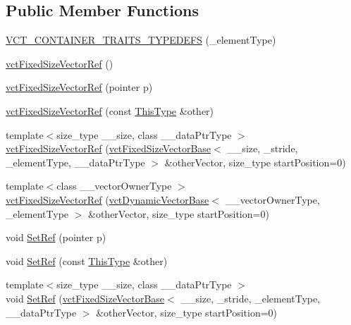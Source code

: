 \subsection*{Public Member Functions}
\begin{DoxyCompactItemize}
\item 
\hyperlink{classvct_fixed_size_vector_ref_a7a66fa8ab6598a28feabe1c86c2f93f9}{V\+C\+T\+\_\+\+C\+O\+N\+T\+A\+I\+N\+E\+R\+\_\+\+T\+R\+A\+I\+T\+S\+\_\+\+T\+Y\+P\+E\+D\+E\+F\+S} (\+\_\+element\+Type)
\item 
\hyperlink{classvct_fixed_size_vector_ref_a543ec7356fcb875f9242700d1928316c}{vct\+Fixed\+Size\+Vector\+Ref} ()
\item 
\hyperlink{classvct_fixed_size_vector_ref_a1fe5202cf31d82049b657f40a3d2caab}{vct\+Fixed\+Size\+Vector\+Ref} (pointer p)
\item 
\hyperlink{classvct_fixed_size_vector_ref_a7434262bdfeea16951f333d9e07113bf}{vct\+Fixed\+Size\+Vector\+Ref} (const \hyperlink{classvct_fixed_size_vector_ref_a3fc8fbdfc7492a38119e7ed7ef5bc289}{This\+Type} \&other)
\item 
{\footnotesize template$<$size\+\_\+type \+\_\+\+\_\+size, class \+\_\+\+\_\+data\+Ptr\+Type $>$ }\\\hyperlink{classvct_fixed_size_vector_ref_abb6cd735a90720681998fd60e78ac6c7}{vct\+Fixed\+Size\+Vector\+Ref} (\hyperlink{classvct_fixed_size_vector_base}{vct\+Fixed\+Size\+Vector\+Base}$<$ \+\_\+\+\_\+size, \+\_\+stride, \+\_\+element\+Type, \+\_\+\+\_\+data\+Ptr\+Type $>$ \&other\+Vector, size\+\_\+type start\+Position=0)
\item 
{\footnotesize template$<$class \+\_\+\+\_\+vector\+Owner\+Type $>$ }\\\hyperlink{classvct_fixed_size_vector_ref_a3d3b0af3edc9d03a70f0df8660117253}{vct\+Fixed\+Size\+Vector\+Ref} (\hyperlink{classvct_dynamic_vector_base}{vct\+Dynamic\+Vector\+Base}$<$ \+\_\+\+\_\+vector\+Owner\+Type, \+\_\+element\+Type $>$ \&other\+Vector, size\+\_\+type start\+Position=0)
\item 
void \hyperlink{classvct_fixed_size_vector_ref_a08bc25aaca173af6a6fbdecd140edbe0}{Set\+Ref} (pointer p)
\item 
void \hyperlink{classvct_fixed_size_vector_ref_a7e79c21f80dbd4137ddfb33ab9c55ecd}{Set\+Ref} (const \hyperlink{classvct_fixed_size_vector_ref_a3fc8fbdfc7492a38119e7ed7ef5bc289}{This\+Type} \&other)
\item 
{\footnotesize template$<$size\+\_\+type \+\_\+\+\_\+size, class \+\_\+\+\_\+data\+Ptr\+Type $>$ }\\void \hyperlink{classvct_fixed_size_vector_ref_a9db29d2d3e4138d144d973224dcb2c39}{Set\+Ref} (\hyperlink{classvct_fixed_size_vector_base}{vct\+Fixed\+Size\+Vector\+Base}$<$ \+\_\+\+\_\+size, \+\_\+stride, \+\_\+element\+Type, \+\_\+\+\_\+data\+Ptr\+Type $>$ \&other\+Vector, size\+\_\+type start\+Position=0)

\end{DoxyCompactItemize}
